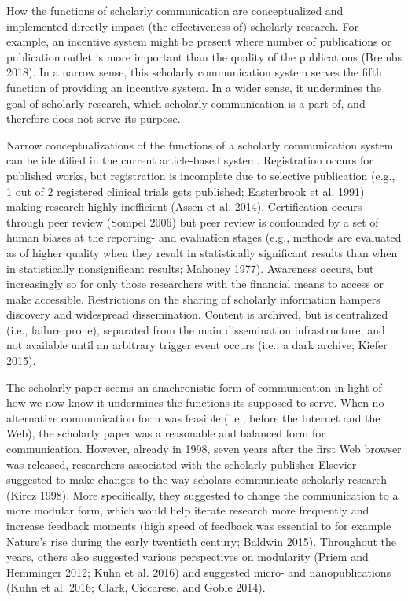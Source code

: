 \documentclass[a4paper]{article}
\begin{document}
How the functions of scholarly communication are conceptualized and
implemented directly impact (the effectiveness of) scholarly research.
For example, an incentive system might be present where number of
publications or publication outlet is more important than the quality of
the publications (Brembs 2018). In a narrow sense, this scholarly
communication system serves the fifth function of providing an incentive
system. In a wider sense, it undermines the goal of scholarly research,
which scholarly communication is a part of, and therefore does not serve
its purpose.

Narrow conceptualizations of the functions of a scholarly communication
system can be identified in the current article-based system.
Registration occurs for published works, but registration is incomplete
due to selective publication (e.g., 1 out of 2 registered clinical
trials gets published; Easterbrook et al. 1991) making research highly
inefficient (Assen et al. 2014). Certification occurs through peer
review (Sompel 2006) but peer review is confounded by a set of human
biases at the reporting- and evaluation stages (e.g., methods are
evaluated as of higher quality when they result in statistically
significant results than when in statistically nonsignificant results;
Mahoney 1977). Awareness occurs, but increasingly so for only those
researchers with the financial means to access or make accessible.
Restrictions on the sharing of scholarly information hampers discovery
and widespread dissemination. Content is archived, but is centralized
(i.e., failure prone), separated from the main dissemination
infrastructure, and not available until an arbitrary trigger event
occurs (i.e., a dark archive; Kiefer 2015).

The scholarly paper seems an anachronistic form of communication in
light of how we now know it undermines the functions its supposed to
serve. When no alternative communication form was feasible (i.e., before
the Internet and the Web), the scholarly paper was a reasonable and
balanced form for communication. However, already in 1998, seven years
after the first Web browser was released, researchers associated with
the scholarly publisher Elsevier suggested to make changes to the way
scholars communicate scholarly research (Kircz 1998). More specifically,
they suggested to change the communication to a more modular form, which
would help iterate research more frequently and increase feedback
moments (high speed of feedback was essential to for example Nature's
rise during the early twentieth century; Baldwin 2015). Throughout the
years, others also suggested various perspectives on modularity (Priem
and Hemminger 2012; Kuhn et al. 2016) and suggested micro- and
nanopublications (Kuhn et al. 2016; Clark, Ciccarese, and Goble 2014).
\end{document}
